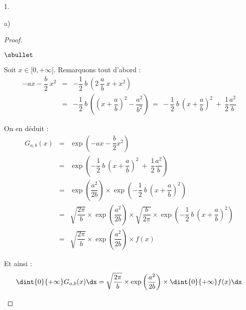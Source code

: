 \begin{noliste}{1.}
\begin{noliste}{a)}
    \begin{proof}~
      \begin{noliste}{$\sbullet$}
      \item Soit $x \in [0, +\infty[$. Remarquons tout d'abord :
        \[
        \begin{array}{rcl}
          -a x - \dfrac{b}{2} \ x^2 & = & - \dfrac{1}{2} \ b \ \left(
            2 \ \dfrac{a}{b} \ x + x^2 \right) \\[.4cm]
          & = & - \dfrac{1}{2} \ b \ \left( \left( x + \dfrac{a}{b}
            \right)^2 - \dfrac{a^2}{b^2} \right) %
          \ = \ - \dfrac{1}{2} \ b \ \left( x + \dfrac{a}{b}
          \right)^2 \ + \ \dfrac{1}{2} \dfrac{a^2}{b}
        \end{array}
        \]

      \item On en déduit : 
        \[
        \begin{array}{rcl}
          G_{a, b}(x) & = & \exp\left( -ax - \dfrac{b}{2} x^2 \right)
          \\[.4cm]
          & = & \exp\left( - \dfrac{1}{2} \ b \ \left( x + \dfrac{a}{b}
            \right)^2 \ + \ \dfrac{1}{2} \dfrac{a^2}{b} \right)
          \\[.4cm]
          & = & \exp\left( \dfrac{a^2}{2b} \right) \times \exp\left( -
            \dfrac{1}{2} \ b \ \left( x + \dfrac{a}{b} \right)^2 \right)
          \\[.4cm]
          & = & \sqrt{\dfrac{2 \pi}{b}} \times \exp\left(
            \dfrac{a^2}{2b} \right) \times \sqrt{\dfrac{b}{2 \pi}}
          \times \exp\left( - \dfrac{1}{2} \ b \ \left( x +
              \dfrac{a}{b} \right)^2 \right) 
          \\[.4cm]
          & = & \sqrt{\dfrac{2 \pi}{b}} \times \exp\left(
            \dfrac{a^2}{2b} \right) \times f(x)
        \end{array}
        \]

      \item Et ainsi : 
        \[
        \dint{0}{+\infty} G_{a,b}(x) \dx = \sqrt{\dfrac{2 \pi}{b}}
        \times \exp\left( \dfrac{a^2}{2b} \right) \times
        \dint{0}{+\infty} f(x) \dx
        \]


\end{noliste}
\end{proof}
\end{noliste}
\end{noliste}
